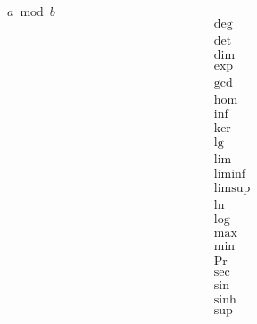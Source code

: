 \documentclass{article}
\begin{document}
\begin{math}
  a \bmod b
\end{math}
\begin{gather*}
  \deg \\ \det \\ \dim \\
  \exp \\ \gcd \\ \hom \\ \inf \\ \ker \\ \lg \\ \lim \\ 
  \liminf \\ \limsup \\ \ln \\ \log \\ \max \\ \min \\ 
  \Pr \\ \sec \\ \sin \\ \sinh \\ \sup  
\end{gather*}
\end{document}
